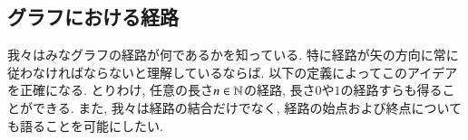 \subsection{グラフにおける経路}\label{sec:paths in graph}


我々はみなグラフの経路が何であるかを知っている. 特に経路が矢の方向に常に従わなければならないと理解しているならば. 以下の定義によってこのアイデアを正確になる. とりわけ, 任意の長さ$n\in{\mathbb N}$の経路, 長さ$0$や$1$の経路すらも得ることができる. また, 我々は経路の結合だけでなく, 経路の始点および終点についても語ることを可能にしたい.

